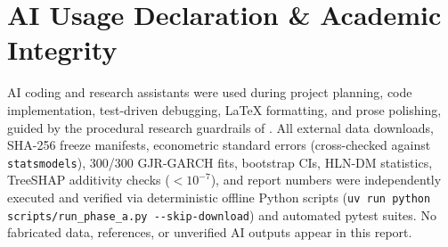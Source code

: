 \documentclass[11pt,a4paper]{article}
\begin{document}
\section*{AI Usage Declaration \& Academic Integrity}
AI coding and research assistants were used during project planning, code
implementation, test-driven debugging, LaTeX formatting, and prose polishing,
guided by the procedural research guardrails of \citet{kassis2026skills}. All
external data downloads, SHA-256 freeze manifests, econometric standard errors
(cross-checked against \texttt{statsmodels}), 300/300 GJR-GARCH fits,
bootstrap CIs, HLN-DM statistics, TreeSHAP additivity checks ($< 10^{-7}$),
and report numbers were independently executed and verified via deterministic
offline Python scripts (\texttt{uv run python scripts/run\_phase\_a.py
-{}-skip-download}) and automated pytest suites. No fabricated data,
references, or unverified AI outputs appear in this report.
\end{document}
